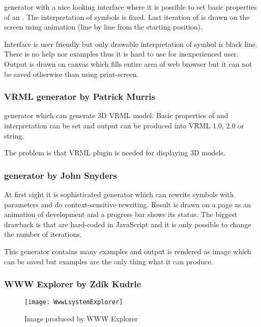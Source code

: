 \noindent
\lsystem generator with a nice looking interface where it is possible to set basic properties of an \lsystem.
The interpretation of symbols is fixed.
Last iteration of \lsystem is drawn on the screen using animation (line by line from the starting position).

Interface is user friendly but only drawable interpretation of symbol is black line.
There is no help nor examples thus it is hard to use for inexperienced user.
Output is drawn on canvas which fills entire area of web browser but it can not be saved otherwise than using print-screen.


\subsubsection{VRML \lsystem generator by Patrick Murris}
  
\noindent
\lsystem generator which can generate 3D VRML model.
Basic properties of \lsystem and interpretation can be set and output can be produced into VRML 1.0, 2.0 or string.

The problem is that VRML plugin is needed for displaying 3D models.



\subsubsection{\lsystem generator by John Snyders}

\noindent
At first sight it is sophisticated \lsystem generator which can rewrite symbols with parameters and do context-sensitive rewriting.
Result is drawn on a page as an animation of development and a progress bar shows its status.
The biggest drawback is that \lsystems are hard-coded in JavaScript and it is only possible to change the number of iterations.

This \lsystem generator contains many examples and output is rendered as image which can be saved but examples are the only thing what it can produce.


\subsubsection{WWW \lsystem Explorer by Zdík Kudrle}

\begin{wrapfigure}{r}{0.45\textwidth}
	\vspace{-20pt}
	\texttt{[image: WwwLsystemExplorer]}
	\caption{Image produced by WWW \lsystem Explorer}
	\label{fig:lsysExplorer}
\end{wrapfigure}

